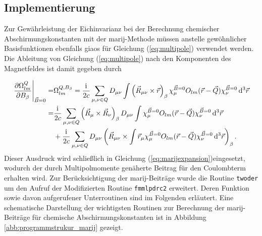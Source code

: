 	\subsection{Implementierung}
Zur Gewährleistung der Eichinvarianz bei der Berechnung chemischer Abschirmungskonstanten mit der \ac{marij}-Methode müssen anstelle gewöhnlicher Basisfunktionen ebenfalls \acp{giao} für Gleichung (\ref{eq:multipole}) verwendet werden. Die Ableitung von Gleichung (\ref{eq:multipole}) nach den Komponenten des Magnetfeldes ist damit gegeben durch

	\begin{equation}\label{eq:multipoledb}
	\begin{aligned}
	\left.\frac{\partial \Omega^Q_{lm}}{\partial B_\beta}\right\vert_{\vec{B}=0}=&\Omega^{Q,B_\beta}_{lm}=\frac{\mathrm{i}\mkern1mu}{2c}\sum_{\mu,\nu \in Q}D_{\mu\nu}\int\left(\vec{R}_{\mu\nu}\times\vec{r}\right)_\beta\chi_\mu^{\vec{B}=0} O_{lm}(\vec{r}-\vec{Q})\chi_{\nu}^{\vec{B}=0}\mathop{}\!\mathrm{d^3} \vec{r}\\
	=&\frac{\mathrm{i}\mkern1mu}{2c}\sum_{\mu,\nu \in Q}\left(\vec{R}_{\mu}\times\vec{R}_{\nu}\right)_\beta D_{\mu\nu}\int\chi_\mu^{\vec{B}=0}O_{lm}(\vec{r}-\vec{Q})\chi_{\nu}^{\vec{B}=0}\mathop{}\!\mathrm{d^3}\vec{r}\\
	&+\frac{\mathrm{i}\mkern1mu}{2c}\sum_{\mu,\nu \in Q}D_{\mu\nu}\left(\vec{R}_{\mu\nu}\times\int\vec{r}_{\mu}\chi_\mu^{\vec{B}=0}O_{lm}(\vec{r}-\vec{Q})\chi_{\nu}^{\vec{B}=0}\mathop{}\!\mathrm{d^3}\vec{r}\right)_\beta .
	\end{aligned}
	\end{equation}
	Dieser Ausdruck wird schließlich in Gleichung (\ref{eq:marijexpansion})eingesetzt, wodurch der durch Multipolmomente genäherte Beitrag für den Coulombterm erhalten wird. Zur Berücksichtigung der \ac{marij}-Beiträge wurde die Routine \texttt{twoder} um den Aufruf der Modifizierten Routine \texttt{fmmlpdrc2} erweitert. Deren Funktion sowie davon aufgerufener Unterroutinen sind im Folgenden erläutert. Eine schematische Darstellung der wichtigsten Routinen zur Berechnung der \ac{marij}-Beiträge für chemische Abschirmungskonstanten ist in Abbildung \ref{abb:programmstrukur_marij} gezeigt.
